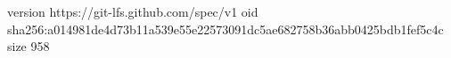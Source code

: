 version https://git-lfs.github.com/spec/v1
oid sha256:a014981de4d73b11a539e55e22573091dc5ae682758b36abb0425bdb1fef5c4c
size 958
